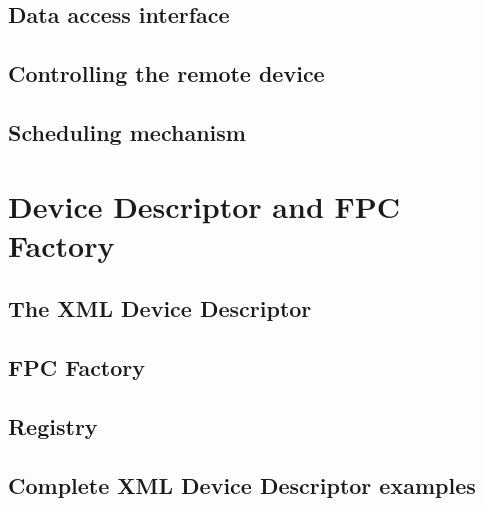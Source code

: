 \subsection{Data access interface}

\subsection{Controlling the remote device}

\subsection{Scheduling mechanism}


\section{Device Descriptor and FPC Factory}

\subsection{The XML Device Descriptor}

\subsection{FPC Factory}

\subsection{Registry}

\subsection{Complete XML Device Descriptor examples}